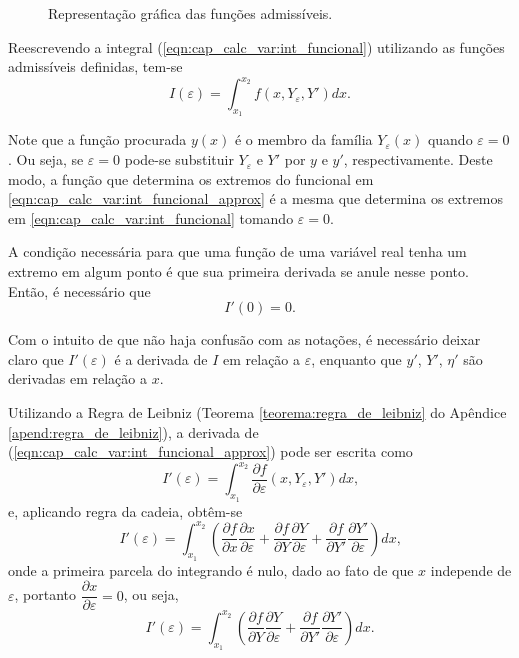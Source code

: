 \documentclass[
	12pt,				%
	openright,			%
    twoside,			%
	a4paper,			%
	chapter=TITLE,		%
	english,			%
	french,				%
	spanish,			%
	brazil				%
	]{abntex2}
\numberwithin{lema}{chapter}
\numberwithin{teorema}{chapter}
\numberwithin{definicao}{chapter}
\numberwithin{exemplo}{chapter}
\numberwithin{figure}{chapter}
\begin{document}
\begin{figure}[!h]
	\caption{Representação gráfica das funções admissíveis.}
	\centering
	
	\resizebox{0.75\textwidth}{!}
	{
		
	}
	
	\label{fig:funcoes_admissiveis}
\end{figure}

Reescrevendo a integral (\ref{eqn:cap_calc_var:int_funcional}) utilizando as funções admissíveis definidas, tem-se
\begin{equation}\label{eqn:cap_calc_var:int_funcional_approx}
I(\varepsilon)=\int_{x_1}^{x_2}f(x, Y_{\varepsilon}, Y')dx\text{.}
\end{equation}

Note que a função procurada $y(x)$ é o membro da família $Y_{\varepsilon}(x)$ quando $\varepsilon = 0$. Ou seja, se $\varepsilon = 0$ pode-se substituir $Y_{\varepsilon}$ e $Y'$ por $y$ e $y'$, respectivamente. Deste modo, a função que determina os extremos do funcional em \eqref{eqn:cap_calc_var:int_funcional_approx} é a mesma que determina os extremos em \eqref{eqn:cap_calc_var:int_funcional} tomando $\varepsilon=0$.

A condição necessária para que uma função de uma variável real tenha um extremo em algum ponto é que sua primeira derivada se anule nesse ponto. Então, é necessário que
\begin{equation}\label{eqn:cap_calc_var:extrem_condition}
	I'(0)=0\text{.}
\end{equation}

Com o intuito de que não haja confusão com as notações, é necessário deixar claro que $I'(\varepsilon)$ é a derivada de $I$ em relação a $\varepsilon$, enquanto que $y'$, $Y'$, $\eta'$ são derivadas em relação a $x$.


Utilizando a Regra de Leibniz (Teorema \ref{teorema:regra_de_leibniz} do Apêndice \ref{apend:regra_de_leibniz}), a derivada de (\ref{eqn:cap_calc_var:int_funcional_approx}) pode ser escrita como
$$I'(\varepsilon)=\int_{x_1}^{x_2} \frac{\partial f}{\partial \varepsilon} (x, Y_{\varepsilon}, Y') dx \text{,}$$
e, aplicando regra da cadeia, obtêm-se
$$I'(\varepsilon)=\int_{x_1}^{x_2}\left ( \frac{\partial f}{\partial x}\frac{\partial x}{\partial \varepsilon} + \frac{\partial f}{\partial Y} \frac{\partial Y}{\partial \varepsilon} + \frac{\partial f}{\partial Y'} \frac{\partial Y'}{\partial \varepsilon} \right )dx\text{,}$$
onde a primeira parcela do integrando é nulo, dado ao fato de que $x$ independe de $\varepsilon$, portanto $\dfrac{\partial x}{\partial \varepsilon}=0$, ou seja,
\begin{equation}\label{eqn:cap_calc_var:chain_rule}
I'(\varepsilon)=\int_{x_1}^{x_2}\left ( \frac{\partial f}{\partial Y}\frac{\partial Y}{\partial \varepsilon} + \frac{\partial f}{\partial Y'}\frac{\partial Y'}{\partial \varepsilon} \right ) dx \text{.}
\end{equation}
\end{document}
